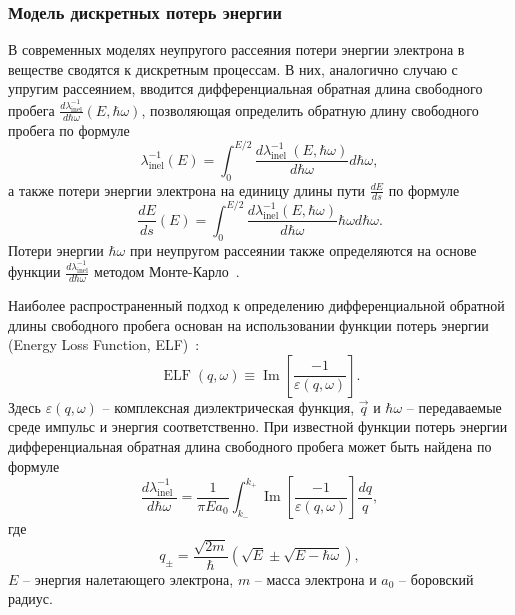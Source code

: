 \subsubsection{Модель дискретных потерь энергии}
В современных моделях неупругого рассеяния потери энергии электрона в веществе сводятся к дискретным процессам. В них, аналогично случаю с упругим рассеянием, вводится дифференциальная обратная длина свободного пробега $\frac{d \lambda_\mathrm{inel}^{-1}}{d \hbar \omega}(E, \hbar \omega)$, позволяющая определить обратную длину свободного пробега по формуле~\cite{Dapor_large_book}
\begin{equation}
	\lambda_\mathrm{inel}^{-1}(E)=\int_0^{E / 2} \frac{d \lambda_{\text {inel }}^{-1}(E, \hbar \omega)}{d \hbar \omega} d \hbar \omega,
\end{equation}
а также потери энергии электрона на единицу длины пути $\frac{dE}{ds}$ по формуле
\begin{equation}
	\frac{dE}{ds}(E) = \int_0^{E / 2} \frac{d \lambda_\mathrm{inel}^{-1}(E, \hbar \omega)}{d \hbar \omega} \hbar \omega d \hbar \omega.
\end{equation}
Потери энергии $\hbar \omega$ при неупругом рассеянии также определяются на основе функции $\frac{d \lambda_\mathrm{inel}^{-1}}{d \hbar \omega}$  методом Монте-Карло~\cite{Ciappa_2010}.

Наиболее распространенный подход к определению дифференциальной обратной длины свободного пробега основан на использовании функции потерь энергии (Energy Loss Function, ELF)~\cite{Dapor_large_book}:
\begin{equation}
	\operatorname{ELF}(q, \omega) \equiv \operatorname{Im}\left[\frac{-1}{\varepsilon(q, \omega)}\right].
\end{equation}
Здесь $\varepsilon(q, \omega)$ -- комплексная диэлектрическая функция, $\vec{q}$ и $\hbar \omega$ -- передаваемые среде импульс и энергия соответственно. При известной функции потерь энергии дифференциальная обратная длина свободного пробега может быть найдена по формуле
\begin{equation}
	\frac{d \lambda_{\text {inel }}^{-1}}{d \hbar \omega}=\frac{1}{\pi E a_0} \int_{k_{-}}^{k_{+}} \operatorname{Im}\left[\frac{-1}{\varepsilon(q, \omega)}\right] \frac{d q}{q},
\end{equation}
где
\begin{equation}
	q_{\pm}=\frac{\sqrt{2 m}}{\hbar}(\sqrt{E} \pm \sqrt{E-\hbar \omega}),
\end{equation}
$E$ -- энергия налетающего электрона, $m$ -- масса электрона и $a_0$ -- боровский радиус.

